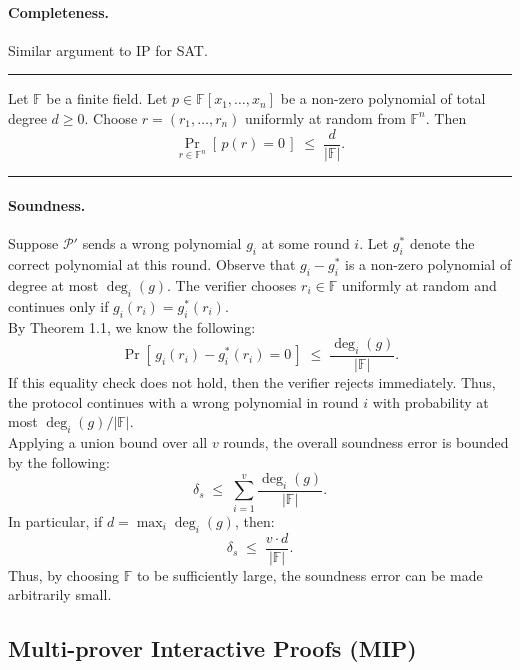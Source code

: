 \myspace
\myspace

\paragraph{Completeness.}
Similar argument to IP for SAT.

\myspace
\myspace
\hrule

\begin{theorem}
Let $\mathbb{F}$ be a finite field. Let $p \in \mathbb{F}[x_1,\dots,x_n]$ be a non-zero polynomial
of total degree $d \ge 0$. Choose $r=(r_1,\dots,r_n)$ uniformly at random from $\mathbb{F}^n$.
Then
\[
\Pr_{r\in \mathbb{F}^n}[\,p(r)=0\,] \;\le\; \frac{d}{|\mathbb{F}|}.
\]
\end{theorem}

\hrule
\myspace

\paragraph{Soundness.}
Suppose \(\mathcal{P}'\) sends a wrong polynomial \(g_i\) at some round \(i\). Let $g^*_i$ denote the correct polynomial at this round. Observe that $g_i - g^*_i$ is a non-zero polynomial of degree at most $\deg_i(g)$. The verifier chooses $r_i \in \mathbb{F}$ uniformly at random and continues only if $g_i(r_i) = g^*_i(r_i)$. \\

\noindent By Theorem 1.1, we know the following:
\[
\Pr[\,g_i(r_i) - g^*_i(r_i) =0\,] \;\le\; \frac{\deg_i(g)}{|\mathbb{F}|}.
\]
If this equality check does not hold, then the verifier rejects immediately. Thus, the protocol continues with a wrong polynomial in round $i$ with probability at most $\deg_i(g)/|\mathbb{F}|$. \\

\noindent Applying a union bound over all $v$ rounds, the overall soundness error is bounded by the following:
\[
\delta_{s} \;\le\; \sum_{i=1}^v \frac{\deg_i(g)}{|\mathbb{F}|}.
\]
In particular, if $d=\max_i \deg_i(g)$, then:
\[
\delta_{s} \;\le\; \frac{v \cdot d}{|\mathbb{F}|}.
\]
Thus, by choosing $\mathbb{F}$ to be sufficiently large, the soundness error can be made arbitrarily small. \\


\subsection{Multi-prover Interactive Proofs (MIP)}

